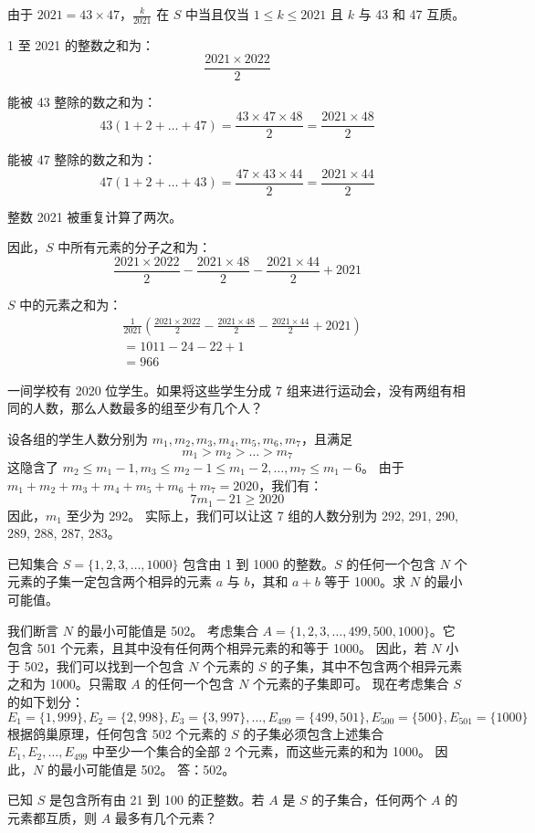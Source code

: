 \begin{questions}
\begin{solution}
由于 $2021 = 43 \times 47$，$\frac{k}{2021}$ 在 $S$ 中当且仅当 $1 \le k \le 2021$ 且 $k$ 与 43 和 47 互质。

1 至 2021 的整数之和为：
\[ \frac{2021 \times 2022}{2} \]

能被 43 整除的数之和为：
\[ 43(1 + 2 + \dots + 47) = \frac{43 \times 47 \times 48}{2} = \frac{2021 \times 48}{2} \]

能被 47 整除的数之和为：
\[ 47(1 + 2 + \dots + 43) = \frac{47 \times 43 \times 44}{2} = \frac{2021 \times 44}{2} \]

整数 2021 被重复计算了两次。

因此，$S$ 中所有元素的分子之和为：
\[ \frac{2021 \times 2022}{2} - \frac{2021 \times 48}{2} - \frac{2021 \times 44}{2} + 2021 \]

$S$ 中的元素之和为：
\begin{align}
&\frac{1}{2021} \left( \frac{2021 \times 2022}{2} - \frac{2021 \times 48}{2} - \frac{2021 \times 44}{2} + 2021 \right) \\
&= 1011 - 24 - 22 + 1 \\
&= 966
\end{align}
\end{solution}
    \question 一间学校有 2020 位学生。如果将这些学生分成 7 组来进行运动会，没有两组有相同的人数，那么人数最多的组至少有几个人？

\begin{solution}
设各组的学生人数分别为 $m_1, m_2, m_3, m_4, m_5, m_6, m_7$，且满足
\[ m_1 > m_2 > \dots > m_7 \]
这隐含了 $m_2 \le m_1 - 1, m_3 \le m_2 - 1 \le m_1 - 2, \dots, m_7 \le m_1 - 6$。
由于 $m_1 + m_2 + m_3 + m_4 + m_5 + m_6 + m_7 = 2020$，我们有：
\[ 7m_1 - 21 \ge 2020 \]
因此，$m_1$ 至少为 292。
实际上，我们可以让这 7 组的人数分别为 292, 291, 290, 289, 288, 287, 283。
\end{solution}
    \question 已知集合 $S = \{1, 2, 3, \dots, 1000\}$ 包含由 1 到 1000 的整数。$S$ 的任何一个包含 $N$ 个元素的子集一定包含两个相异的元素 $a$ 与 $b$，其和 $a + b$ 等于 1000。求 $N$ 的最小可能值。

\begin{solution}
我们断言 $N$ 的最小可能值是 502。
考虑集合 $A = \{1, 2, 3, \dots, 499, 500, 1000\}$。它包含 501 个元素，且其中没有任何两个相异元素的和等于 1000。
因此，若 $N$ 小于 502，我们可以找到一个包含 $N$ 个元素的 $S$ 的子集，其中不包含两个相异元素之和为 1000。只需取 $A$ 的任何一个包含 $N$ 个元素的子集即可。
现在考虑集合 $S$ 的如下划分：
\[
E_1 = \{1, 999\}, E_2 = \{2, 998\}, E_3 = \{3, 997\}, \dots, E_{499} = \{499, 501\}, E_{500} = \{500\}, E_{501} = \{1000\}
\]
根据鸽巢原理，任何包含 502 个元素的 $S$ 的子集必须包含上述集合 $E_1, E_2, \dots, E_{499}$ 中至少一个集合的全部 2 个元素，而这些元素的和为 1000。
因此，$N$ 的最小可能值是 502。
答：502。
\end{solution}
\question 已知 $S$ 是包含所有由 21 到 100 的正整数。若 $A$ 是 $S$ 的子集合，任何两个 $A$ 的元素都互质，则 $A$ 最多有几个元素？


\end{questions}

